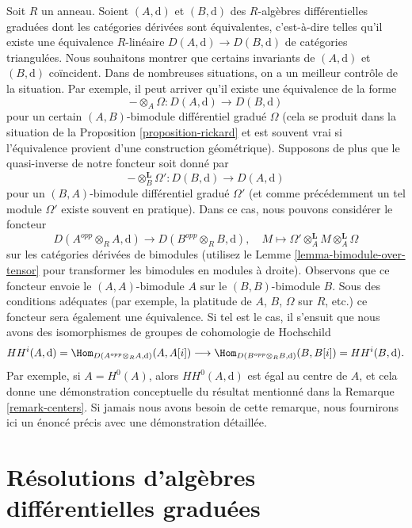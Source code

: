 \begin{remark}
\label{remark-hochschild-cohomology}
Soit $R$ un anneau. Soient $(A, \text{d})$ et $(B, \text{d})$ des $R$-algèbres
différentielles graduées dont les catégories dérivées sont équivalentes, c’est-à-dire telles qu’il
existe une équivalence $R$-linéaire $D(A, \text{d}) \to D(B, \text{d})$ de
catégories triangulées. Nous souhaitons montrer que certains invariants de $(A,
\text{d})$ et $(B, \text{d})$ coïncident. Dans de nombreuses situations, on a un
meilleur contrôle de la situation. Par exemple, il peut arriver qu’il existe une
équivalence de la forme
$$
- \otimes_A \Omega : D(A, \text{d}) \longrightarrow D(B, \text{d})
$$
pour un certain $(A, B)$-bimodule différentiel gradué $\Omega$ (cela se produit
dans la situation de la Proposition \ref{proposition-rickard} et est souvent vrai
si l'équivalence provient d'une construction géométrique). Supposons de plus que le
quasi-inverse de notre foncteur soit donné par
$$
- \otimes_B^\mathbf{L} \Omega' : D(B, \text{d}) \longrightarrow D(A, \text{d})
$$
pour un $(B, A)$-bimodule différentiel gradué $\Omega'$ (et comme précédemment un
tel module $\Omega'$ existe souvent en pratique). Dans ce cas, nous pouvons
considérer le foncteur
$$
D(A^{opp} \otimes_R A, \text{d})
\longrightarrow
D(B^{opp} \otimes_R B, \text{d}),\quad
M \longmapsto \Omega' \otimes^\mathbf{L}_A M \otimes_A^\mathbf{L} \Omega
$$
sur les catégories dérivées de bimodules (utilisez le Lemme
\ref{lemma-bimodule-over-tensor} pour transformer les bimodules en modules à
droite). Observons que ce foncteur envoie le $(A, A)$-bimodule $A$ sur le
$(B, B)$-bimodule $B$. Sous des conditions adéquates (par exemple, la
platitude de $A$, $B$, $\Omega$ sur $R$, etc.) ce foncteur sera également une
équivalence. Si tel est le cas, il s'ensuit que nous avons des isomorphismes de
groupes de cohomologie de Hochschild
$$
HH^i(A, \text{d}) =
\Hom_{D(A^{opp} \otimes_R A, \text{d})}(A, A[i])
\longrightarrow
\Hom_{D(B^{opp} \otimes_R B, \text{d})}(B, B[i]) =
HH^i(B, \text{d}).
$$
Par exemple, si $A = H^0(A)$, alors $HH^0(A, \text{d})$ est égal au centre de $A$,
et cela donne une démonstration conceptuelle du résultat mentionné dans la
Remarque \ref{remark-centers}. Si jamais nous avons besoin de cette remarque, nous
fournirons ici un énoncé précis avec une démonstration détaillée.
\end{remark}



\section{Résolutions d'algèbres différentielles graduées}
\label{section-resolution-dgas}

